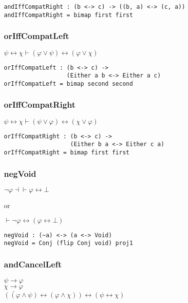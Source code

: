 \documentclass{acm_proc_article-sp}
\renewcommand{\iff}{\leftrightarrow}
\renewcommand{\implies}{\rightarrow}
\begin{document}
\begin{verbatim}
andIffCompatRight : (b <-> c) -> ((b, a) <-> (c, a))
andIffCompatRight = bimap first first
\end{verbatim}

\subsubsection{orIffCompatLeft}\label{oriffcompatleft}

\(\psi \iff \chi \vdash (\varphi \lor \psi) \iff (\varphi \lor \chi)\)

\begin{verbatim}
orIffCompatLeft : (b <-> c) ->
                  (Either a b <-> Either a c)
orIffCompatLeft = bimap second second
\end{verbatim}

\subsubsection{orIffCompatRight}\label{oriffcompatright}

\(\psi \iff \chi \vdash (\psi \lor \varphi) \iff (\chi \lor \varphi)\)

\begin{verbatim}
orIffCompatRight : (b <-> c) ->
                   (Either b a <-> Either c a)
orIffCompatRight = bimap first first
\end{verbatim}

\subsubsection{negVoid}\label{negvoid}

\(\neg \varphi \dashv\vdash \varphi \iff \bot\)

or

\(\vdash \neg \varphi \iff (\varphi \iff \bot)\)

\begin{verbatim}
negVoid : (~a) <-> (a <-> Void)
negVoid = Conj (flip Conj void) proj1
\end{verbatim}

\subsubsection{andCancelLeft}\label{andcancelleft}

\(\psi \implies \varphi\)\\
\(\underline{\chi \implies \varphi}\)\\
\(((\varphi \land \psi) \iff (\varphi \land \chi)) \iff (\psi \iff \chi)\)
\end{document}
